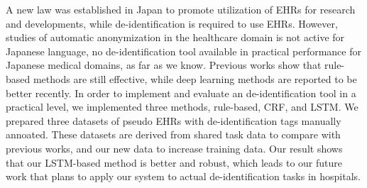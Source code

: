 A new law was established in Japan to promote utilization of EHRs for research and developments, while de-identification is required to use EHRs. However, studies of automatic anonymization in the healthcare domain is not active for Japanese language, no de-identification tool available in practical performance for Japanese medical domains, as far as we know. Previous works show that rule-based methods are still effective, while deep learning methods are reported to be better recently. In order to implement and evaluate an de-identification tool in a practical level, we implemented three methods, rule-based, CRF, and LSTM. We prepared three datasets of pseudo EHRs with de-identification tags manually annoated. These datasets are derived from shared task data to compare with previous works, and our new data to increase training data. Our result shows that our LSTM-based method is better and robust, which leads to our future work that plans to apply our system to actual de-identification tasks in hospitals.
